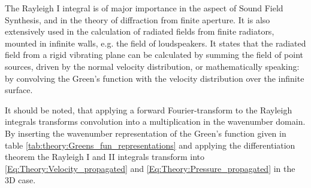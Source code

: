 The Rayleigh I integral is of major importance in the aspect of Sound Field Synthesis, and in the theory of diffraction from finite aperture. It is also extensively used in the calculation of radiated fields from finite radiators, mounted in infinite walls, e.g. the field of loudspeakers. It states that the radiated field from a rigid vibrating plane can be calculated by summing the field of point sources, driven by the normal velocity distribution, or mathematically speaking: by convolving the Green's function with the velocity distribution over the infinite surface.

It should be noted, that applying a forward Fourier-transform to the Rayleigh integrals transforms convolution into a multiplication in the wavenumber domain. By inserting the wavenumber representation of the Green's function given in table \ref{tab:theory:Greens_fun_representations}  and applying the differentiation theorem the Rayleigh I and II integrals transform into \eqref{Eq:Theory:Velocity_propagated} and \eqref{Eq:Theory:Pressure_propagated} in the 3D case.

